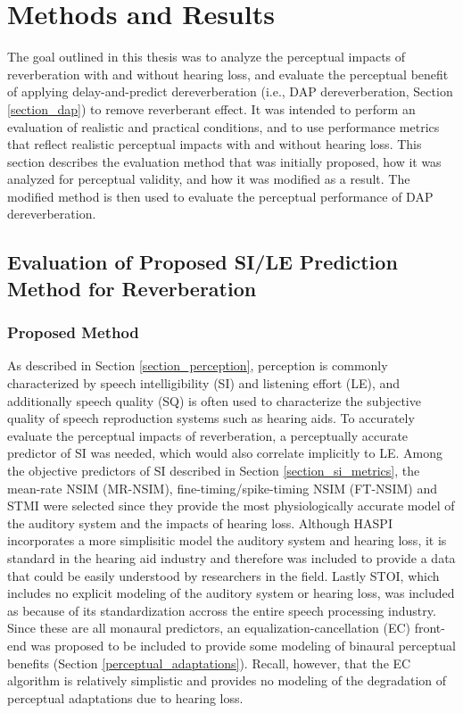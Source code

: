 \chapter{Methods and Results}

The goal outlined in this thesis was to analyze the perceptual impacts of reverberation with and without hearing loss, and evaluate the perceptual benefit of applying delay-and-predict dereverberation (i.e., DAP dereverberation, Section \ref{section_dap}) to remove reverberant effect. It was intended to perform an evaluation of realistic and practical conditions, and to use performance metrics that reflect realistic perceptual impacts with and without hearing loss. This section describes the evaluation method that was initially proposed, how it was analyzed for perceptual validity, and how it was modified as a result. The modified method is then used to evaluate the perceptual performance of DAP dereverberation.

\section{Evaluation of Proposed SI/LE Prediction Method for Reverberation} \label{section:initial_eval_method}

\subsection{Proposed Method}

As described in Section \ref{section_perception}, perception is commonly characterized by speech intelligibility (SI) and listening effort (LE), and additionally speech quality (SQ) is often used to characterize the subjective quality of speech reproduction systems such as hearing aids. To accurately evaluate the perceptual impacts of reverberation, a perceptually accurate predictor of SI was needed, which would also correlate implicitly to LE. Among the objective predictors of SI described in Section \ref{section_si_metrics}, the mean-rate NSIM (MR-NSIM), fine-timing/spike-timing NSIM (FT-NSIM) and STMI were selected since they provide the most physiologically accurate model of the auditory system and the impacts of hearing loss. Although HASPI incorporates a more simplisitic model the auditory system and hearing loss, it is standard in the hearing aid industry and therefore was included to provide a data that could be easily understood by researchers in the field. Lastly STOI, which includes no explicit modeling of the auditory system or hearing loss, was included as because of its standardization accross the entire speech processing industry. Since these are all monaural predictors, an equalization-cancellation (EC) front-end was proposed to be included to provide some modeling of binaural perceptual benefits (Section \ref{perceptual_adaptations}). Recall, however, that the EC algorithm is relatively simplistic and provides no modeling of the degradation of perceptual adaptations due to hearing loss.

